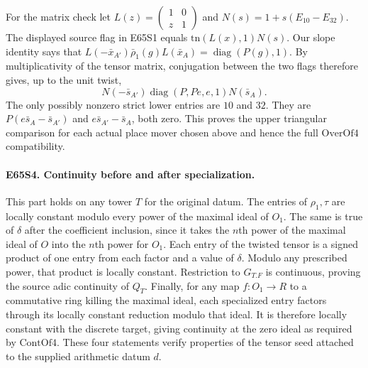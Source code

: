 For the matrix check let $L(z)=\left(\begin{smallmatrix}1&0\\z&1\end{smallmatrix}\right)$
and $N(s)=1+s(E_{10}-E_{32})$. The displayed source flag in E65S1
equals $\mathrm{tn}(L(x),1)N(s)$. Our slope identity says that
$L(-\bar x_{A'})\bar\rho_1(g)L(\bar x_A)=\operatorname{diag}(P(g),1)$.
By multiplicativity of the tensor matrix, conjugation between the two
flags therefore gives, up to the unit twist,
\[
 N(-\bar s_{A'})\operatorname{diag}(P,Pe,e,1)N(\bar s_A).
\]
The only possibly nonzero strict lower entries are $10$ and $32$.
They are $P(e\bar s_A-\bar s_{A'})$ and
$e\bar s_{A'}-\bar s_A$, both zero. This proves the upper triangular
comparison for each actual place mover chosen above and hence the full
$\mathrm{OverOf4}$ compatibility.

\paragraph{E65S4. Continuity before and after specialization.}
This part holds on any tower $T$ for the original datum. The
entries of $\rho_1,\tau$ are locally constant modulo every power of
the maximal ideal of $O_1$. The same is true of $\delta$ after the
coefficient inclusion, since it takes the $n$th power of the maximal
ideal of $O$ into the $n$th power for $O_1$. Each entry of the
twisted tensor is a signed product of one entry from each factor
and a value of $\delta$. Modulo any prescribed power, that product
is locally constant. Restriction to $G_{T.F}$ is continuous, proving
the source adic continuity of $Q_T$. Finally, for any map $f:O_1\to R$
to a commutative ring killing the maximal ideal, each specialized
entry factors through its locally constant reduction modulo that
ideal. It is therefore locally constant with the discrete target,
giving continuity at the zero ideal as required by
$\mathrm{ContOf4}$. These four statements verify properties of the
tensor seed attached to the supplied arithmetic datum $d$.
